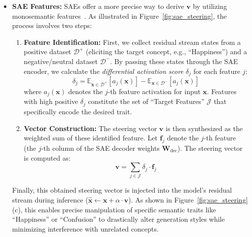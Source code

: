 \documentclass[11pt,letterpaper]{mystyle}
\begin{document}
\begin{itemize}
    \item \textbf{SAE Features:} SAEs offer a more precise way to derive $\mathbf{v}$ by utilizing monosemantic features~\citep{wang2025beyond,bayat2025steering,weng2025safe,he2025saif,soo2025interpretable,goyalBreakingBadTokens2025}. As illustrated in Figure~\ref{fig:sae_steering}, the process involves two steps:
    \begin{enumerate}
        \item \textbf{Feature Identification:} First, we collect residual stream states from a positive dataset $\mathcal{D}^+$ (eliciting the target concept, e.g., ``Happiness'') and a negative/neutral dataset $\mathcal{D}^-$. By passing these states through the SAE encoder, we calculate the \textit{differential activation score} $\delta_j$ for each feature $j$:
        \begin{equation}
        \delta_j = \mathbb{E}_{\mathbf{x} \in \mathcal{D}^+}[a_j(\mathbf{x})] - \mathbb{E}_{\mathbf{x} \in \mathcal{D}^-}[a_j(\mathbf{x})]
        \end{equation}
        where $a_j(\mathbf{x})$ denotes the $j$-th feature activation for input $\mathbf{x}$. Features with high positive $\delta_j$ constitute the set of ``Target Features'' $\mathcal{J}$ that specifically encode the desired trait.
        \item \textbf{Vector Construction:} The steering vector $\mathbf{v}$ is then synthesized as the weighted sum of these identified feature. Let $\mathbf{f}_j$ denote the $j$-th feature (the $j$-th column of the SAE decoder weights $\mathbf{W}_{\text{dec}}$). The steering vector is computed as:
        \begin{equation}
        \mathbf{v} = \sum_{j \in \mathcal{J}} \delta_j \cdot \mathbf{f}_j
        \end{equation}
        
    \end{enumerate}
    Finally, this obtained steering vector is injected into the model's residual stream during inference ($\hat{\mathbf{x}} \leftarrow \mathbf{x} + \alpha \cdot \mathbf{v}$). As shown in Figure~\ref{fig:sae_steering} (c), this enables precise manipulation of specific semantic traits like ``Happiness'' or ``Confusion'' to drastically alter generation styles while minimizing interference with unrelated concepts.
\end{itemize}
\end{document}
